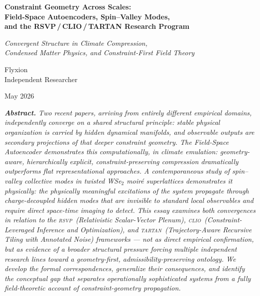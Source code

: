 \documentclass[11pt,a4paper]{article}
\theoremstyle{plain}
\theoremstyle{definition}
\theoremstyle{remark}
\newcommand{\RSVP}{\textup{\textsc{rsvp}}}
\newcommand{\CLIO}{\textup{\textsc{clio}}}
\newcommand{\TARTAN}{\textup{\textsc{tartan}}}
\begin{document}
\begin{titlepage}
\vspace*{2cm}
\begin{center}

{\LARGE\bfseries Constraint Geometry Across Scales:\\[0.3em]
Field-Space Autoencoders, Spin--Valley Modes,\\[0.3em]
and the RSVP\,/\,CLIO\,/\,TARTAN Research Program}

\vspace{1.2em}

{\large\itshape Convergent Structure in Climate Compression,\\
Condensed Matter Physics, and Constraint-First Field Theory}

\vspace{2em}

{\large Flyxion}\\[0.3em]
{\small Independent Researcher}

\vspace{1.5em}

{\small May 2026}

\vspace{3em}

\begin{minipage}{0.82\textwidth}
\small\itshape
\noindent\textbf{Abstract.}
Two recent papers, arriving from entirely different empirical domains,
independently converge on a shared structural principle: stable physical
organization is carried by hidden dynamical manifolds, and observable
outputs are secondary projections of that deeper constraint geometry.
The Field-Space Autoencoder demonstrates this computationally, in climate
emulation: geometry-aware, hierarchically explicit, constraint-preserving
compression dramatically outperforms flat representational approaches.
A contemporaneous study of spin--valley collective modes in twisted
WSe$_2$ moiré superlattices demonstrates it physically: the physically
meaningful excitations of the system propagate through charge-decoupled
hidden modes that are invisible to standard local observables and require
direct space-time imaging to detect. This essay examines both convergences
in relation to the \RSVP\ (Relativistic Scalar-Vector Plenum), \CLIO\
(Constraint-Leveraged Inference and Optimization), and \TARTAN\
(Trajectory-Aware Recursive Tiling with Annotated Noise) frameworks ---
not as direct empirical confirmation, but as evidence of a broader
structural pressure forcing multiple independent research lines toward a
geometry-first, admissibility-preserving ontology. We develop the formal
correspondences, generalize their consequences, and identify the conceptual
gap that separates operationally sophisticated systems from a fully
field-theoretic account of constraint-geometry propagation.
\end{minipage}

\end{center}
\end{titlepage}
\end{document}
